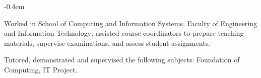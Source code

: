 \documentclass{cv}
\begin{document}
\begin{list}{}{\setlength{\leftmargin}{0em}}
\begin{list}{\raisebox{0.2em}{\tiny$\bullet$} \hspace{0em}}{\setlength{\leftmargin}{1.2em}}
        \itemsep -0.4em \vspace{-0.4em}
        \item Worked in School of Computing and Information Systems, Faculty of Engineering and Information Technology; assisted course coordinators to prepare teaching materials, supervise examinations, and assess student assignments.
        \item Tutored, demonstrated and supervised the following subjects: Foundation of Computing, IT Project.
    \end{list}
\end{list}

\end{document}
